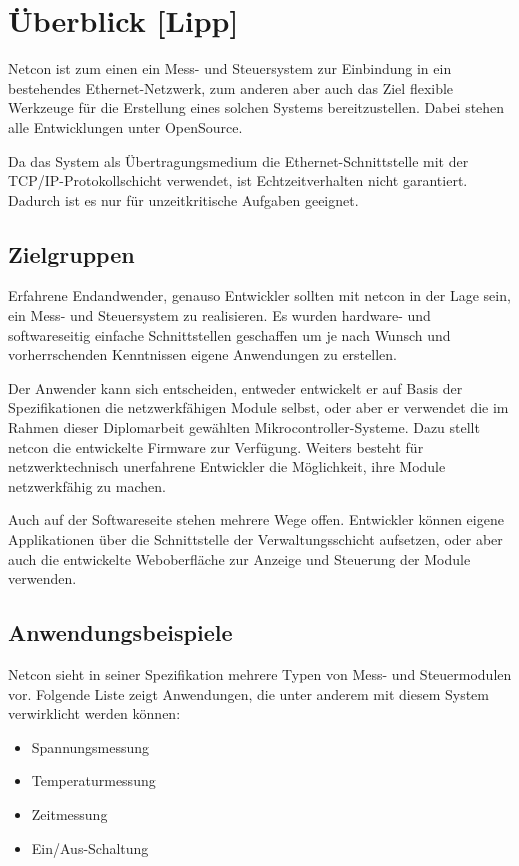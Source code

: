\documentclass[a4paper,14pt,headsepline]{scrartcl}
\begin{document}
\newpage

\tableofcontents
\newpage


\section{Überblick [Lipp]}

Netcon ist zum einen ein Mess- und Steuersystem zur Einbindung in ein bestehendes Ethernet-Netzwerk, zum anderen aber auch das Ziel flexible Werkzeuge für die Erstellung eines solchen Systems bereitzustellen. Dabei stehen alle Entwicklungen unter OpenSource. 

Da das System als Übertragungsmedium die Ethernet-Schnittstelle mit der TCP/IP-Protokollschicht verwendet, ist Echtzeitverhalten nicht garantiert. Dadurch ist es nur für unzeitkritische Aufgaben geeignet. 

\subsection{Zielgruppen}
Erfahrene Endandwender, genauso Entwickler sollten mit netcon in der Lage sein, ein Mess- und Steuersystem zu realisieren. Es wurden hardware- und softwareseitig einfache Schnittstellen geschaffen um je nach Wunsch und vorherrschenden Kenntnissen eigene Anwendungen zu erstellen. 

Der Anwender kann sich entscheiden, entweder entwickelt er auf Basis der Spezifikationen die netzwerkfähigen Module selbst, oder aber er verwendet die im Rahmen dieser Diplomarbeit gewählten Mikrocontroller-Systeme. Dazu stellt netcon die entwickelte Firmware zur Verfügung. Weiters besteht für netzwerktechnisch unerfahrene Entwickler die Möglichkeit, ihre Module netzwerkfähig zu machen.

Auch auf der Softwareseite stehen mehrere Wege offen. Entwickler können eigene Applikationen über die Schnittstelle der Verwaltungsschicht aufsetzen, oder aber auch die entwickelte Weboberfläche zur Anzeige und Steuerung der Module verwenden.

\subsection{Anwendungsbeispiele}
Netcon sieht in seiner Spezifikation mehrere Typen von Mess- und Steuermodulen vor. Folgende Liste zeigt Anwendungen, die unter anderem mit diesem System verwirklicht werden können:
\begin{itemize}
	\item Spannungsmessung
	\item Temperaturmessung
	\item Zeitmessung
	\item Ein/Aus-Schaltung
\end{itemize}
\end{document}
